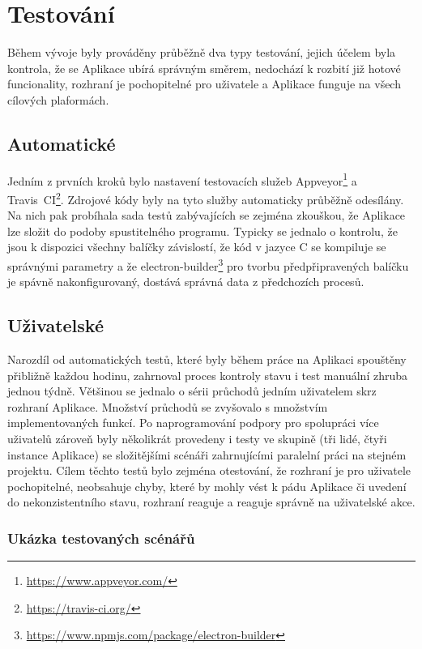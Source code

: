 \chapter{Testování}

Během vývoje byly prováděny průběžně dva typy testování, jejich účelem byla kontrola, že se Aplikace ubírá správným směrem, nedochází k rozbití již hotové funcionality, rozhraní je pochopitelné pro uživatele a Aplikace funguje na všech cílových plaformách.

\section{Automatické}

Jedním z prvních kroků bylo nastavení testovacích služeb Appveyor\footnote{\url{https://www.appveyor.com/}} a Travis~CI\footnote{\url{https://travis-ci.org/}}. Zdrojové kódy byly na tyto služby automaticky průběžně odesílány. Na nich pak probíhala sada testů zabývajících se zejména zkouškou, že Aplikace lze složit do podoby spustitelného programu. Typicky se jednalo o kontrolu, že jsou k dispozici všechny balíčky závislostí, že kód v jazyce C se kompiluje se správnými parametry a že electron-builder\footnote{\url{https://www.npmjs.com/package/electron-builder}} pro tvorbu předpřipravených balíčku je spávně nakonfigurovaný, dostává správná data z předchozích procesů.

\section{Uživatelské}

Narozdíl od automatických testů, které byly během práce na Aplikaci spouštěny přibližně každou hodinu, zahrnoval proces kontroly stavu i test manuální zhruba jednou týdně. Většinou se jednalo o sérii průchodů jedním uživatelem skrz rozhraní Aplikace. Množství průchodů se zvyšovalo s množstvím implementovaných funkcí. Po naprogramování podpory pro spolupráci více uživatelů zároveň byly několikrát provedeny i testy ve skupině (tři lidé, čtyři instance Aplikace) se složitějšími scénáři zahrnujícími paralelní práci na stejném projektu. Cílem těchto testů bylo zejména otestování, že rozhraní je pro uživatele pochopitelné, neobsahuje chyby, které by mohly vést k pádu Aplikace či uvedení do nekonzistentního stavu, rozhraní reaguje a reaguje správně na uživatelské akce.

\subsection{Ukázka testovaných scénářů}

